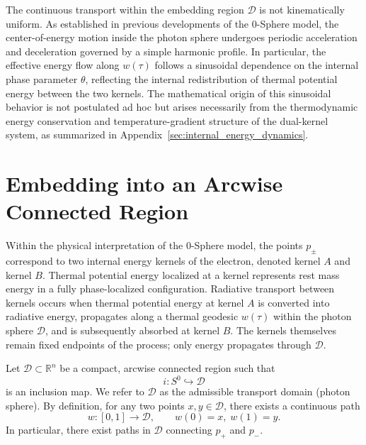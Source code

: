 \documentclass[%
 reprint,
 amsmath,amssymb,
 aps,
 prb,
]{revtex4-2}
\numberwithin{equation}{section}
\begin{document}
The continuous transport within the embedding region $\mathcal{D}$ is not kinematically uniform.
As established in previous developments of the 0-Sphere model, the center-of-energy motion inside the photon sphere undergoes periodic acceleration and deceleration governed by a simple harmonic profile.
In particular, the effective energy flow along $w(\tau)$ follows a sinusoidal dependence on the internal phase parameter $\theta$, reflecting the internal redistribution of thermal potential energy between the two kernels.
The mathematical origin of this sinusoidal behavior is not postulated ad hoc but arises necessarily from the thermodynamic energy conservation and temperature-gradient structure of the dual-kernel system, as summarized in Appendix~\ref{sec:internal_energy_dynamics}.


\section{Embedding into an Arcwise Connected Region}
\label{sec:embedding}

Within the physical interpretation of the 0-Sphere model, the points $p_{\pm}$ correspond to two internal energy kernels of the electron, denoted kernel $A$ and kernel $B$.
Thermal potential energy localized at a kernel represents rest mass energy in a fully phase-localized configuration.
Radiative transport between kernels occurs when thermal potential energy at kernel $A$ is converted into radiative energy, propagates along a thermal geodesic $w(\tau)$ within the photon sphere $\mathcal{D}$, and is subsequently absorbed at kernel $B$.
The kernels themselves remain fixed endpoints of the process; only energy propagates through $\mathcal{D}$.

Let $\mathcal{D} \subset \mathbb{R}^{n}$ be a compact, arcwise connected region \cite{Munkres2000} such that
\begin{equation}
i : S^{0} \hookrightarrow \mathcal{D}
\end{equation}
is an inclusion map. We refer to $\mathcal{D}$ as the admissible transport domain (photon sphere). By definition, for any two points $x,y \in \mathcal{D}$, there exists a continuous path
\begin{equation}
w : [0,1] \rightarrow \mathcal{D}, \qquad w(0)=x,\; w(1)=y .
\end{equation}
In particular, there exist paths in $\mathcal{D}$ connecting $p_{+}$ and $p_{-}$.
\end{document}
